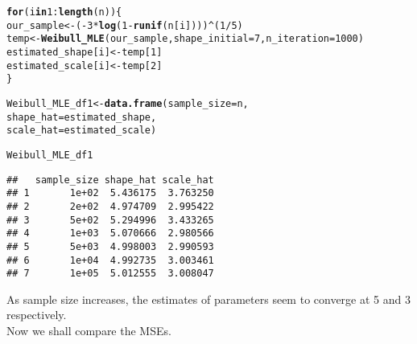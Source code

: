 \documentclass[11pt, a4paper]{article}\usepackage[]{graphicx}\usepackage[]{xcolor}
\makeatletter
\newcommand{\hlnum}[1]{\textcolor[rgb]{0.686,0.059,0.569}{#1}}%
\newcommand{\hlopt}[1]{\textcolor[rgb]{0,0,0}{#1}}%
\newcommand{\hldef}[1]{\textcolor[rgb]{0.345,0.345,0.345}{#1}}%
\newcommand{\hlkwa}[1]{\textcolor[rgb]{0.161,0.373,0.58}{\textbf{#1}}}%
\newcommand{\hlkwb}[1]{\textcolor[rgb]{0.69,0.353,0.396}{#1}}%
\newcommand{\hlkwc}[1]{\textcolor[rgb]{0.333,0.667,0.333}{#1}}%
\newcommand{\hlkwd}[1]{\textcolor[rgb]{0.737,0.353,0.396}{\textbf{#1}}}%
\newenvironment{kframe}{%
 \def\at@end@of@kframe{}%
 \ifinner\ifhmode%
  \def\at@end@of@kframe{\end{minipage}}%
  \begin{minipage}{\columnwidth}%
 \fi\fi%
 \def\FrameCommand##1{\hskip\@totalleftmargin \hskip-\fboxsep
 \colorbox{shadecolor}{##1}\hskip-\fboxsep
     \hskip-\linewidth \hskip-\@totalleftmargin \hskip\columnwidth}%
 \MakeFramed {\advance\hsize-\width
   \@totalleftmargin\z@ \linewidth\hsize
   \@setminipage}}%
 {\par\unskip\endMakeFramed%
 \at@end@of@kframe}
\newenvironment{knitrout}{}{} %
\makeatother
\begin{document}
\begin{knitrout}
\color{fgcolor}\begin{kframe}
\begin{alltt}
\hlkwa{for} \hldef{(i} \hlkwa{in} \hlnum{1}\hlopt{:}\hlkwd{length}\hldef{(n)) \{}
  \hldef{our_sample} \hlkwb{<-} \hldef{(}\hlopt{-} \hlnum{3} \hlopt{*} \hlkwd{log}\hldef{(}\hlnum{1} \hlopt{-} \hlkwd{runif}\hldef{(n[i])))}\hlopt{^}\hldef{(}\hlnum{1}\hlopt{/}\hlnum{5}\hldef{)}
  \hldef{temp} \hlkwb{<-} \hlkwd{Weibull_MLE}\hldef{(our_sample,} \hlkwc{shape_initial} \hldef{=} \hlnum{7}\hldef{,} \hlkwc{n_iteration} \hldef{=} \hlnum{1000}\hldef{)}
  \hldef{estimated_shape[i]} \hlkwb{<-} \hldef{temp[}\hlnum{1}\hldef{]}
  \hldef{estimated_scale[i]} \hlkwb{<-} \hldef{temp[}\hlnum{2}\hldef{]}
\hldef{\}}
\end{alltt}
\end{kframe}
\end{knitrout}

\begin{knitrout}
\color{fgcolor}\begin{kframe}
\begin{alltt}
\hldef{Weibull_MLE_df1} \hlkwb{<-} \hlkwd{data.frame}\hldef{(}\hlkwc{sample_size} \hldef{= n,}
                            \hlkwc{shape_hat} \hldef{= estimated_shape,}
                            \hlkwc{scale_hat} \hldef{= estimated_scale)}
\end{alltt}
\end{kframe}
\end{knitrout}

\begin{knitrout}
\color{fgcolor}\begin{kframe}
\begin{alltt}
\hldef{Weibull_MLE_df1}
\end{alltt}
\begin{verbatim}
##   sample_size shape_hat scale_hat
## 1       1e+02  5.436175  3.763250
## 2       2e+02  4.974709  2.995422
## 3       5e+02  5.294996  3.433265
## 4       1e+03  5.070666  2.980566
## 5       5e+03  4.998003  2.990593
## 6       1e+04  4.992735  3.003461
## 7       1e+05  5.012555  3.008047
\end{verbatim}
\end{kframe}
\end{knitrout}

\smallpencil \hspace{0.1cm} {\setlength{\spaceskip}{1em plus 0.5em minus 0.5em} \fontsize{17}{20}\myfont As sample size increases, the estimates of parameters seem to converge at 5 and 3 respectively. \\

Now we shall compare the MSEs.
\par}
\end{document}
